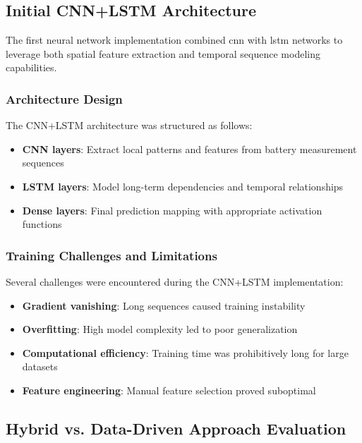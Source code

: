 \subsection{Initial CNN+LSTM Architecture}

The first neural network implementation combined \gls{cnn} with \gls{lstm} networks to leverage both spatial feature extraction and temporal sequence modeling capabilities.

\subsubsection{Architecture Design}

The CNN+LSTM architecture was structured as follows:

\begin{itemize}
    \item \textbf{CNN layers}: Extract local patterns and features from battery measurement sequences
    \item \textbf{LSTM layers}: Model long-term dependencies and temporal relationships
    \item \textbf{Dense layers}: Final prediction mapping with appropriate activation functions
\end{itemize}

\subsubsection{Training Challenges and Limitations}

Several challenges were encountered during the CNN+LSTM implementation:

\begin{itemize}
    \item \textbf{Gradient vanishing}: Long sequences caused training instability
    \item \textbf{Overfitting}: High model complexity led to poor generalization
    \item \textbf{Computational efficiency}: Training time was prohibitively long for large datasets
    \item \textbf{Feature engineering}: Manual feature selection proved suboptimal
\end{itemize}

\subsection{Hybrid vs. Data-Driven Approach Evaluation}


